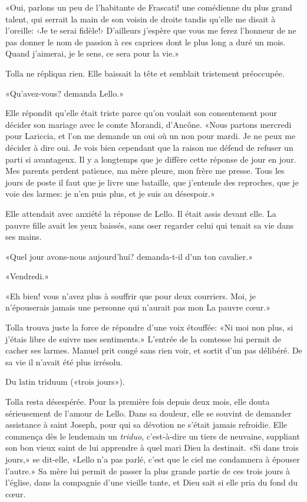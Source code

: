 «Oui, parlons un peu de l'habitante de Frascati! une comédienne du plus
grand talent, qui serrait la main de son voisin de droite tandis qu'elle
me disait à l'oreille: ‹Je te serai fidèle!› D'ailleurs j'espère que
vous me ferez l'honneur de ne pas donner le nom de passion à ces
caprices dont le plus long a duré un mois. Quand j'aimerai, je le sens,
ce sera pour la vie.»

Tolla ne répliqua rien. Elle baissait la tête et semblait tristement
préoccupée.

«Qu'avez-vous? demanda Lello.»

Elle répondit qu'elle était triste parce qu'on voulait son consentement
pour décider son mariage avec le comte Morandi, d'Ancône. «Nous partons
mercredi pour Lariccia, et l'on me demande un oui où un non pour mardi.
Je ne peux me décider à dire oui. Je vois bien cependant que la raison
me défend de refuser un parti si avantageux. Il y a longtemps que je
diffère cette réponse de jour en jour. Mes parents perdent patience, ma
mère pleure, mon frère me presse. Tous les jours de poste il faut que je
livre une bataille, que j'entende des reproches, que je voie des larmes:
je n'en puis plus, et je suis au désespoir.»

Elle attendait avec anxiété la réponse de Lello. Il était assis devant
elle. La pauvre fille avait les yeux baissés, sans oser regarder celui
qui tenait sa vie dans ses mains.

«Quel jour avons-nous aujourd'hui? demanda-t-il d'un ton cavalier.»

«Vendredi.»

«Eh bien! vous n'avez plus à souffrir que pour deux courriers. Moi, je
n'épouserais jamais une personne qui n'aurait pas mon La pauvre cœur.»

Tolla trouva juste la force de répondre d'une voix étouffée: «Ni moi non
plus, si j'étais libre de suivre mes sentiments.» L'entrée de la
comtesse lui permit de cacher ses larmes. Manuel prit congé sans rien
voir, et sortit d'un pas délibéré. De sa vie il n'avait été plus
irrésolu.

Du latin triduum («trois jours»).

Tolla resta désespérée. Pour la première fois depuis deux mois, elle
douta sérieusement de l'amour de Lello. Dans sa douleur, elle se souvint
de demander assistance à saint Joseph, pour qui sa dévotion ne s'était
jamais refroidie. Elle commença dès le lendemain un \emph{triduo},
c'est-à-dire un tiers de neuvaine, suppliant son bon vieux saint de lui
apprendre à quel mari Dieu la destinait. «Si dans trois jours,» se
dit-elle, «Lello n'a pas parlé, c'est que le ciel me condamnera à
épouser l'autre.» Sa mère lui permit de passer la plus grande partie de
ces trois jours à l'église, dans la compagnie d'une vieille tante, et
Dieu sait si elle pria du fond du cœur.


